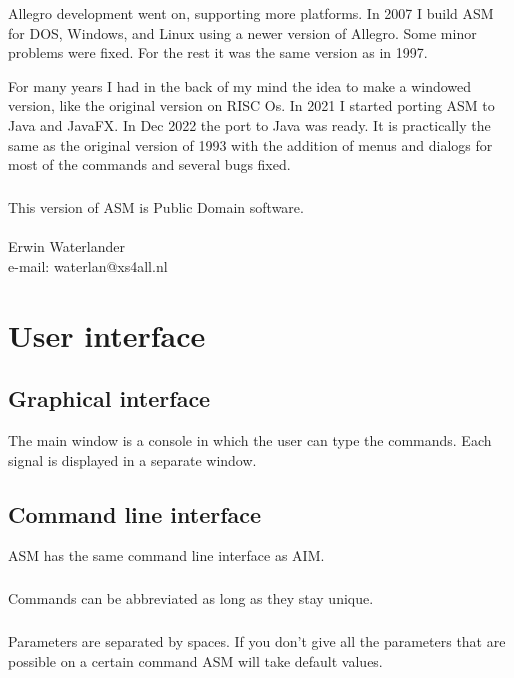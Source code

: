 \documentclass{report}
\begin{document}
Allegro development went on, supporting more platforms.  In 2007 I build ASM
for DOS, Windows, and Linux using a newer version of Allegro.  Some minor
problems were fixed. For the rest it was the same version as in 1997.

For many years I had in the back of my mind the idea to make a windowed
version, like the original version on RISC Os. In 2021 I started porting ASM to
Java and JavaFX. In Dec 2022 the port to Java was ready. It is practically the
same as the original version of 1993 with the addition of menus and dialogs for
most of the commands and several bugs fixed.

\paragraph{}
This version of ASM is Public Domain software.\\\\
Erwin Waterlander\\
e-mail: waterlan@xs4all.nl


\chapter{User interface}

\section{Graphical interface}

The main window is a console in which the user can type the
commands. Each signal is displayed in a separate window.

\section{Command line interface}

ASM has the same command line interface as AIM.

\paragraph{}
Commands can be abbreviated as long as they stay unique.

\paragraph{}
Parameters are separated by spaces.
If you don't give all the parameters that are possible on
a certain command ASM will take default values.
\end{document}
